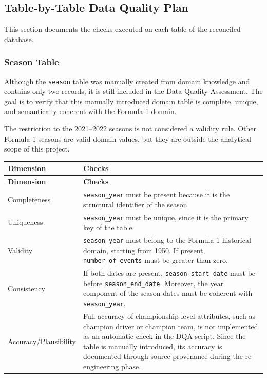 \documentclass[a4paper,11pt]{article}
\begin{document}
	\subsection{Table-by-Table Data Quality Plan}

	
	This section documents the checks executed on each table of the reconciled database.
	

	\subsubsection{Season Table}
	
	Although the \texttt{season} table was manually created from domain knowledge and
	contains only two records, it is still included in the Data Quality Assessment.
	The goal is to verify that this manually introduced domain table is complete, unique,
	and semantically coherent with the Formula 1 domain.
	
	
	The restriction to the 2021--2022 seasons is not considered a validity rule. Other
	Formula 1 seasons are valid domain values, but they are outside the analytical scope of
	this project.
	
	\begin{longtable}{p{3.5cm}p{11cm}}
		\toprule
		\textbf{Dimension} & \textbf{Checks} \\
		\midrule
		\endfirsthead
		
		\toprule
		\textbf{Dimension} & \textbf{Checks} \\
		\midrule
		\endhead
		
		Completeness
		& \texttt{season\_year} must be present because it is the structural identifier of the season. \\
		\midrule
		
		Uniqueness
		& \texttt{season\_year} must be unique, since it is the primary key of the table. \\
		\midrule
		
		Validity
		& \texttt{season\_year} must belong to the Formula 1 historical domain, starting from 1950.
		If present, \texttt{number\_of\_events} must be greater than zero. \\
		\midrule
		
		Consistency
		& If both dates are present, \texttt{season\_start\_date} must be before
		\texttt{season\_end\_date}. Moreover, the year component of the season dates must be coherent with
		\texttt{season\_year}. \\
		\midrule
		
		Accuracy/Plausibility
		& Full accuracy of championship-level attributes, such as champion driver or champion team,
		is not implemented as an automatic check in the DQA script. Since the table is manually introduced,
		its accuracy is documented through source provenance during the re-engineering phase. \\
		\midrule
		
		\bottomrule
	\end{longtable}
	
\end{document}
